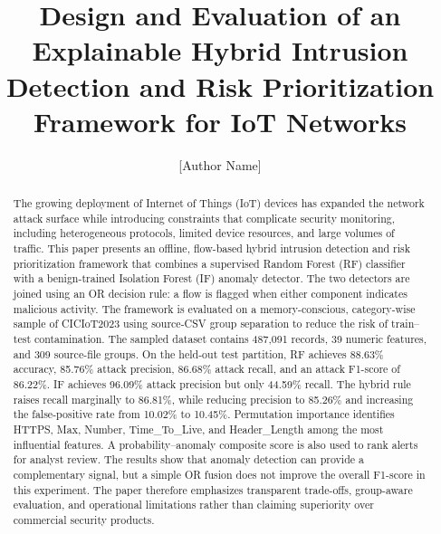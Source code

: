 \documentclass[runningheads]{llncs}
\begin{document}
\title{Design and Evaluation of an Explainable Hybrid Intrusion Detection and Risk Prioritization Framework for IoT Networks}
\author{[Author Name]}
\maketitle

\begin{abstract}
The growing deployment of Internet of Things (IoT) devices has expanded the network attack surface while introducing constraints that complicate security monitoring, including heterogeneous protocols, limited device resources, and large volumes of traffic. This paper presents an offline, flow-based hybrid intrusion detection and risk prioritization framework that combines a supervised Random Forest (RF) classifier with a benign-trained Isolation Forest (IF) anomaly detector. The two detectors are joined using an OR decision rule: a flow is flagged when either component indicates malicious activity. The framework is evaluated on a memory-conscious, category-wise sample of CICIoT2023 using source-CSV group separation to reduce the risk of train--test contamination. The sampled dataset contains 487,091 records, 39 numeric features, and 309 source-file groups. On the held-out test partition, RF achieves 88.63\% accuracy, 85.76\% attack precision, 86.68\% attack recall, and an attack F1-score of 86.22\%. IF achieves 96.09\% attack precision but only 44.59\% recall. The hybrid rule raises recall marginally to 86.81\%, while reducing precision to 85.26\% and increasing the false-positive rate from 10.02\% to 10.45\%. Permutation importance identifies HTTPS, Max, Number, Time\_To\_Live, and Header\_Length among the most influential features. A probability--anomaly composite score is also used to rank alerts for analyst review. The results show that anomaly detection can provide a complementary signal, but a simple OR fusion does not improve the overall F1-score in this experiment. The paper therefore emphasizes transparent trade-offs, group-aware evaluation, and operational limitations rather than claiming superiority over commercial security products.
\end{abstract}
\end{document}
